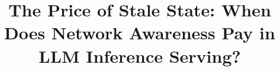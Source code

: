\documentclass[journal,10pt]{IEEEtran}

\usepackage{graphicx}
\usepackage{booktabs}
\usepackage{amsmath,amssymb}
\usepackage{url}
\usepackage{xcolor}
\usepackage{array}
\usepackage{multirow}
\usepackage{siunitx}
\usepackage[hidelinks]{hyperref}

\graphicspath{{figures/}}

\setlength{\emergencystretch}{3em}

\newcolumntype{R}[1]{>{\raggedleft\arraybackslash}p{#1}}



\title{The Price of Stale State: When Does Network Awareness Pay in \\
       LLM Inference Serving?}

\author{%
}

